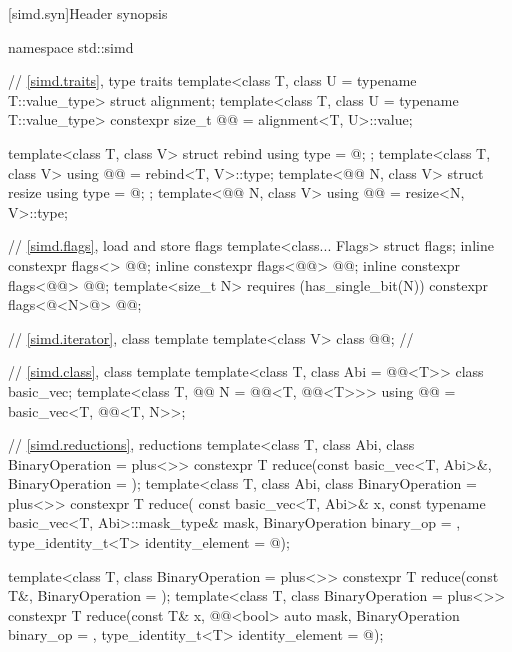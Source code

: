[simd.syn]{Header  synopsis}
%
\begin{codeblock}
namespace std::simd {
  // \ref{simd.traits}, type traits
  template<class T, class U = typename T::value_type> struct alignment;
  template<class T, class U = typename T::value_type>
    constexpr size_t @@ = alignment<T, U>::value;

  template<class T, class V> struct rebind { using type = @\seebelow@; };
  template<class T, class V> using @@ = rebind<T, V>::type;
  template<@@ N, class V> struct resize { using type = @\seebelow@; };
  template<@@ N, class V> using @@ = resize<N, V>::type;

  // \ref{simd.flags}, load and store flags
  template<class... Flags> struct flags;
  inline constexpr flags<> @@{};
  inline constexpr flags<@@> @@{};
  inline constexpr flags<@@> @@{};
  template<size_t N> requires (has_single_bit(N))
    constexpr flags<@<N>@> @@{};

  // \ref{simd.iterator}, class template 
  template<class V>
    class @@;                // \expos

  // \ref{simd.class}, class template 
  template<class T, class Abi = @@<T>> class basic_vec;
  template<class T, @@ N = @@<T, @@<T>>>
    using @@ = basic_vec<T, @@<T, N>>;

  // \ref{simd.reductions}, reductions
  template<class T, class Abi, class BinaryOperation = plus<>>
    constexpr T reduce(const basic_vec<T, Abi>&, BinaryOperation = {});
  template<class T, class Abi, class BinaryOperation = plus<>>
    constexpr T reduce(
      const basic_vec<T, Abi>& x, const typename basic_vec<T, Abi>::mask_type& mask,
      BinaryOperation binary_op = {}, type_identity_t<T> identity_element = @\seebelow@);

  template<class T, class BinaryOperation = plus<>>
    constexpr T reduce(const T&, BinaryOperation = {});
  template<class T, class BinaryOperation = plus<>>
    constexpr T reduce(const T& x, @@<bool> auto mask, BinaryOperation binary_op = {},
                       type_identity_t<T> identity_element = @\seebelow@);

}
\end{codeblock}
